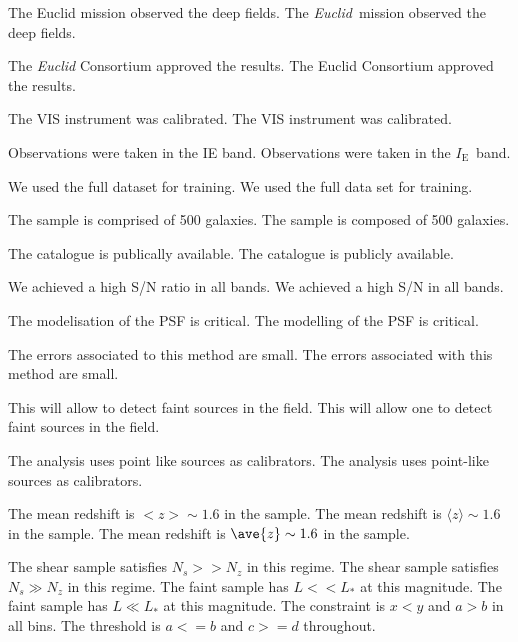 \documentclass{article}
\newcommand{\Euclid}{\textit{Euclid}}
\newcommand{\IE}{$I_{\mathrm{E}}$}
\begin{document}

The Euclid mission observed the deep fields. %
The \Euclid\ mission observed the deep fields. %

The \textit{Euclid} Consortium approved the results. %
The Euclid Consortium approved the results. %

The \textsc{VIS} instrument was calibrated. %
The VIS instrument was calibrated. %

Observations were taken in the IE band. %
Observations were taken in the \IE\ band. %

We used the full dataset for training. %
We used the full data set for training. %

The sample is comprised of 500 galaxies. %
The sample is composed of 500 galaxies. %

The catalogue is publically available. %
The catalogue is publicly available. %

We achieved a high S/N ratio in all bands. %
We achieved a high S/N in all bands. %

The modelisation of the PSF is critical. %
The modelling of the PSF is critical. %

The errors associated to this method are small. %
The errors associated with this method are small. %

This will allow to detect faint sources in the field. %
This will allow one to detect faint sources in the field. %

The analysis uses point like sources as calibrators. %
The analysis uses point-like sources as calibrators. %

The mean redshift is $<z>\sim 1.6$ in the sample. %
The mean redshift is $\langle z \rangle \sim 1.6$ in the sample. %
The mean redshift is $\ave{z} \sim 1.6$ in the sample. %

The shear sample satisfies $N_s >> N_z$ in this regime. %
The shear sample satisfies $N_s \gg N_z$ in this regime. %
The faint sample has $L << L_*$ at this magnitude. %
The faint sample has $L \ll L_*$ at this magnitude. %
The constraint is $x < y$ and $a > b$ in all bins. %
The threshold is $a <= b$ and $c >= d$ throughout. %
\end{document}
